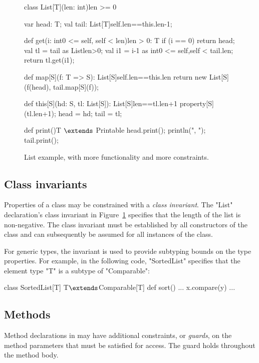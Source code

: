 \begin{figure}
{\footnotesize
\begin{xtenmathnoindent}
class List[T](len: int){len >= 0} {
  var head: T;
  val tail: List[T]{self.len==this.len-1};

  def get(i: int{0 <= self, self < len}){len > 0}: T {
    if (i == 0)
      return head;
    val tl = tail as List{len>0};
    val i1 = i-1 as int{0 <= self,self < tail.len};
    return tl.get(i1);
  }

  def map[S](f: T => S): List[S]{self.len==this.len} {
    return new List[S](f(head), tail.map[S](f));
  }

  def this[S](hd: S, tl: List[S]):
      List[S]{len==tl.len+1} {
    property[S](tl.len+1);
    head = hd; tail = tl;
  }

  def print(){T $\extends$ Printable} {
    head.print();
    println(", ");
    tail.print();
  }
}
\end{xtenmathnoindent}}
\caption{List example, with more functionality and more
constraints.}
\label{fig:list}
\end{figure}

\subsection{Class invariants}

Properties of a class may be constrained with 
a \emph{class invariant}.
The \xcd"List" declaration's class invariant in
Figure~\ref{fig:list} specifies that the length of
the list is non-negative.
The class invariant must be established by all constructors of
the class and can subsequently be assumed for all instances of the class.

For generic types, the invariant is used to provide subtyping
bounds on the type properties.
For example, in the following code,
\xcd"SortedList" 
specifies that the element type \xcd"T"
is a subtype of \xcd"Comparable":
\begin{xtenmath}
class SortedList[T] {T$\extends$Comparable[T]} {
  def sort() { ... x.compare(y) ... }
}
\end{xtenmath}


\subsection{Methods}

Method declarations in \Xten
may have additional
constraints, or \emph{guards}, on the method parameters
that must be satisfied for access.
The guard holds throughout the method body.

